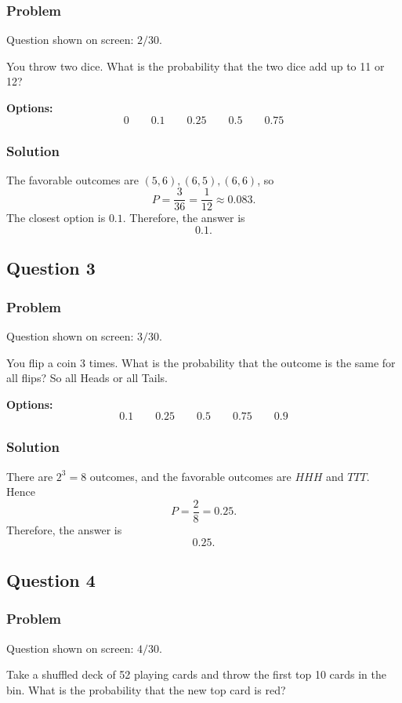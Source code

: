 \documentclass[12pt]{article}
\begin{document}
\subsubsection{Problem}
Question shown on screen: \(2/30\).

You throw two dice. What is the probability that the two dice add up to 11 or 12?

\noindent\textbf{Options:}
\[
\boxed{0}
\qquad
\boxed{0.1}
\qquad
\boxed{0.25}
\qquad
\boxed{0.5}
\qquad
\boxed{0.75}
\]

\subsubsection{Solution}
The favorable outcomes are \((5,6),(6,5),(6,6)\), so
\[
P=\frac{3}{36}=\frac{1}{12}\approx 0.083.
\]
The closest option is \(0.1\). Therefore, the answer is
\[
\boxed{0.1}.
\]

\subsection{Question 3}
\subsubsection{Problem}
Question shown on screen: \(3/30\).

You flip a coin 3 times. What is the probability that the outcome is the same for all flips? So all Heads or all Tails.

\noindent\textbf{Options:}
\[
\boxed{0.1}
\qquad
\boxed{0.25}
\qquad
\boxed{0.5}
\qquad
\boxed{0.75}
\qquad
\boxed{0.9}
\]

\subsubsection{Solution}
There are \(2^3=8\) outcomes, and the favorable outcomes are \(HHH\) and \(TTT\). Hence
\[
P=\frac{2}{8}=0.25.
\]
Therefore, the answer is
\[
\boxed{0.25}.
\]

\subsection{Question 4}
\subsubsection{Problem}
Question shown on screen: \(4/30\).

Take a shuffled deck of 52 playing cards and throw the first top 10 cards in the bin. What is the probability that the new top card is red?
\end{document}
